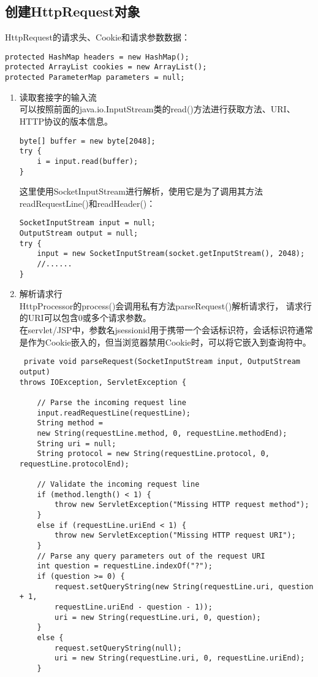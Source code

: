 \subsection{创建HttpRequest对象}
HttpRequest的请求头、Cookie和请求参数数据：
\begin{lstlisting}
protected HashMap headers = new HashMap();
protected ArrayList cookies = new ArrayList();
protected ParameterMap parameters = null;
\end{lstlisting}
\begin{enumerate}
	\item 读取套接字的输入流\\
	可以按照前面的java.io.InputStream类的read()方法进行获取方法、URI、HTTP协议的版本信息。
	\begin{lstlisting}
byte[] buffer = new byte[2048];
try {
	i = input.read(buffer);
}
	\end{lstlisting}
	这里使用SocketInputStream进行解析，使用它是为了调用其方法readRequestLine()和readHeader()：
	\begin{lstlisting}
SocketInputStream input = null;
OutputStream output = null;
try {
	input = new SocketInputStream(socket.getInputStream(), 2048);
	//......
}
	\end{lstlisting}
	\item 解析请求行\\
	HttpProcessor的process()会调用私有方法parseRequest()解析请求行，
	请求行的URI可以包含0或多个请求参数。\\
	在servlet/JSP中，参数名jsessionid用于携带一个会话标识符，会话标识符通常是作为Cookie嵌入的，但当浏览器禁用Cookie时，可以将它嵌入到查询符中。
	\begin{lstlisting}
 private void parseRequest(SocketInputStream input, OutputStream output)
throws IOException, ServletException {
	
	// Parse the incoming request line
	input.readRequestLine(requestLine);
	String method =
	new String(requestLine.method, 0, requestLine.methodEnd);
	String uri = null;
	String protocol = new String(requestLine.protocol, 0, requestLine.protocolEnd);
	
	// Validate the incoming request line
	if (method.length() < 1) {
		throw new ServletException("Missing HTTP request method");
	}
	else if (requestLine.uriEnd < 1) {
		throw new ServletException("Missing HTTP request URI");
	}
	// Parse any query parameters out of the request URI
	int question = requestLine.indexOf("?");
	if (question >= 0) {
		request.setQueryString(new String(requestLine.uri, question + 1,
		requestLine.uriEnd - question - 1));
		uri = new String(requestLine.uri, 0, question);
	}
	else {
		request.setQueryString(null);
		uri = new String(requestLine.uri, 0, requestLine.uriEnd);
	}
	

\end{lstlisting}
\end{enumerate}
